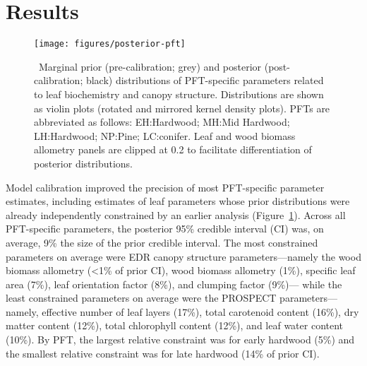 \section{Results}

\begin{figure}
  \centering
  \texttt{[image: figures/posterior-pft]}
  \caption{\label{fig:posterior-pft}\
    Marginal prior (pre-calibration; grey) and posterior (post-calibration; black) distributions of PFT-specific parameters
    related to leaf biochemistry and canopy structure.
    Distributions are shown as violin plots (rotated and mirrored kernel density plots).
    PFTs are abbreviated as follows:
    EH:\@Early Hardwood;
    MH:\@North Mid Hardwood;
    LH:\@Late Hardwood;
    NP:\@Northern Pine;
    LC:\@Late conifer.
    Leaf and wood biomass allometry panels are clipped at 0.2 to facilitate differentiation of posterior distributions.
  }
\end{figure}

Model calibration improved the precision of most PFT-specific parameter estimates, including estimates of leaf parameters whose prior distributions were already independently constrained by an earlier analysis (Figure~\ref{fig:posterior-pft}).
Across all PFT-specific parameters, the posterior 95\% credible interval (CI) was, on average, 9\% the size of the prior credible interval.
The most constrained parameters on average were EDR canopy structure parameters---namely the wood biomass allometry (<1\% of prior CI), wood biomass allometry (1\%), specific leaf area (7\%), leaf orientation factor (8\%), and clumping factor (9\%)---
while the least constrained parameters on average were the PROSPECT parameters---namely, effective number of leaf layers (17\%), total carotenoid content (16\%), dry matter content (12\%), total chlorophyll content (12\%), and leaf water content (10\%).
By PFT, the largest relative constraint was for early hardwood (5\%) and the smallest relative constraint was for late hardwood (14\% of prior CI).

